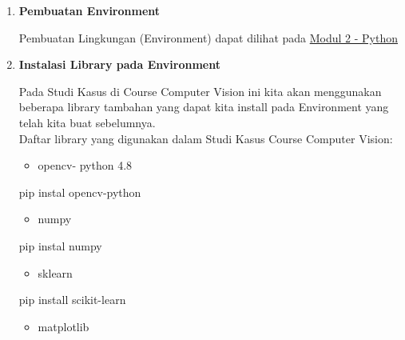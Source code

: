 \documentclass[
  letterpaper,
  DIV=11,
  numbers=noendperiod]{scrreprt}
\newenvironment{Shaded}{\begin{snugshade}}{\end{snugshade}}
\newcommand{\NormalTok}[1]{\textcolor[rgb]{0.00,0.23,0.31}{#1}}
\providecommand{\tightlist}{%
  \setlength{\itemsep}{0pt}\setlength{\parskip}{0pt}}\usepackage{longtable,booktabs,array}
\begin{document}
\begin{enumerate}
\def\labelenumi{\arabic{enumi}.}
\item
  \textbf{Pembuatan Environment}

  Pembuatan Lingkungan (Environment) dapat dilihat pada
  \protect\hyperlink{instalasi-python-dan-lingkungannya}{Modul 2 -
  Python}
\item
  \textbf{Instalasi Library pada Environment}

  Pada Studi Kasus di Course Computer Vision ini kita akan menggunakan
  beberapa library tambahan yang dapat kita install pada Environment
  yang telah kita buat sebelumnya.\\
  Daftar library yang digunakan dalam Studi Kasus Course Computer
  Vision:

  \begin{itemize}
  \tightlist
  \item
    opencv- python 4.8\\
  \end{itemize}

\begin{Shaded}
\begin{Highlighting}[]
\NormalTok{pip instal opencv{-}python}
\end{Highlighting}
\end{Shaded}

  \begin{itemize}
  \tightlist
  \item
    numpy\\
  \end{itemize}

\begin{Shaded}
\begin{Highlighting}[]
\NormalTok{pip instal numpy  }
\end{Highlighting}
\end{Shaded}

  \begin{itemize}
  \tightlist
  \item
    sklearn\\
  \end{itemize}

\begin{Shaded}
\begin{Highlighting}[]
\NormalTok{pip install scikit{-}learn}
\end{Highlighting}
\end{Shaded}

  \begin{itemize}
  \tightlist
  \item
    matplotlib\\
  \end{itemize}


\end{enumerate}
\end{document}
